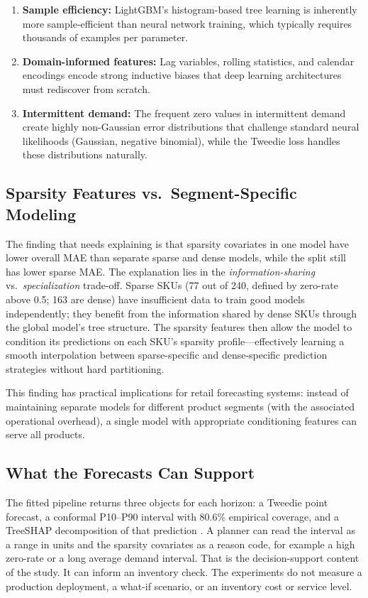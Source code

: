 \documentclass[review,authoryear]{elsarticle}
\begin{document}
\begin{enumerate}
    \item \textbf{Sample efficiency:} LightGBM's histogram-based tree learning is inherently more sample-efficient than neural network training, which typically requires thousands of examples per parameter.
    \item \textbf{Domain-informed features:} Lag variables, rolling statistics, and calendar encodings encode strong inductive biases that deep learning architectures must rediscover from scratch.
    \item \textbf{Intermittent demand:} The frequent zero values in intermittent demand create highly non-Gaussian error distributions that challenge standard neural likelihoods (Gaussian, negative binomial), while the Tweedie loss handles these distributions naturally.
\end{enumerate}

\subsection{Sparsity Features vs.\ Segment-Specific Modeling}

The finding that needs explaining is that sparsity covariates in one model have lower overall MAE than separate sparse and dense models, while the split still has lower sparse MAE. The explanation lies in the \emph{information-sharing} vs.\ \emph{specialization} trade-off. Sparse SKUs (77 out of 240, defined by zero-rate above 0.5; 163 are dense) have insufficient data to train good models independently; they benefit from the information shared by dense SKUs through the global model's tree structure. The sparsity features then allow the model to condition its predictions on each SKU's sparsity profile---effectively learning a smooth interpolation between sparse-specific and dense-specific prediction strategies without hard partitioning.

This finding has practical implications for retail forecasting systems: instead of maintaining separate models for different product segments (with the associated operational overhead), a single model with appropriate conditioning features can serve all products.

\subsection{What the Forecasts Can Support}

The fitted pipeline returns three objects for each horizon: a Tweedie point forecast, a conformal P10--P90 interval with 80.6\% empirical coverage, and a TreeSHAP decomposition of that prediction \citep{lundberg2020trees}. A planner can read the interval as a range in units and the sparsity covariates as a reason code, for example a high zero-rate or a long average demand interval. That is the decision-support content of the study. It can inform an inventory check. The experiments do not measure a production deployment, a what-if scenario, or an inventory cost or service level.
\end{document}
